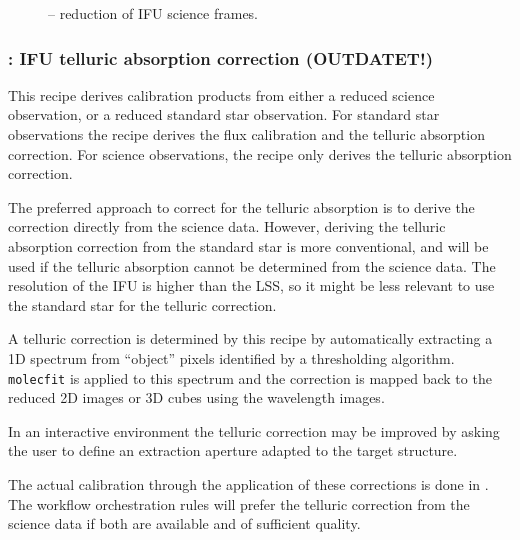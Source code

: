\begin{figure}[hb]
  \centering
    \def \globalscale {0.700000}
    \fontsize{10}{12}\selectfont
    
  \caption[Recipe: ]{%
     -- reduction of IFU science frames.}
  \label{fig:metis_ifu_reduce}
\end{figure}
\restoregeometry

\clearpage
\subsubsection{: IFU telluric absorption correction (OUTDATET!)}
\label{sssec:ifu_telluric}
\label{rec:metis_ifu_telluric}

This recipe derives calibration products from either a reduced science
observation, or a reduced standard star observation.
For standard star observations the recipe derives the flux calibration and the
telluric absorption correction.
For science observations, the recipe only derives the telluric absorption
correction.

The preferred approach to correct for the telluric absorption is to derive the
correction directly from the science data.
However, deriving the telluric absorption correction from the standard star
is more conventional, and will be used if the telluric absorption cannot be
determined from the science data.
The resolution of the \ac{IFU} is higher than the \ac{LSS}, so it might be less
relevant to use the standard star for the telluric correction.

A telluric correction is determined by this recipe by automatically
extracting a 1D spectrum from ``object'' pixels identified by a
thresholding algorithm. \lstinline{molecfit} is applied to this
spectrum and the correction is mapped back to the reduced 2D images or
3D cubes using the wavelength images.

In an interactive environment the telluric correction may be improved by asking
the user to define an extraction aperture adapted to the target
structure.


The actual calibration through the application of these corrections is done in .
The workflow orchestration rules will prefer the telluric correction from the
science data if both are available and of sufficient quality.

